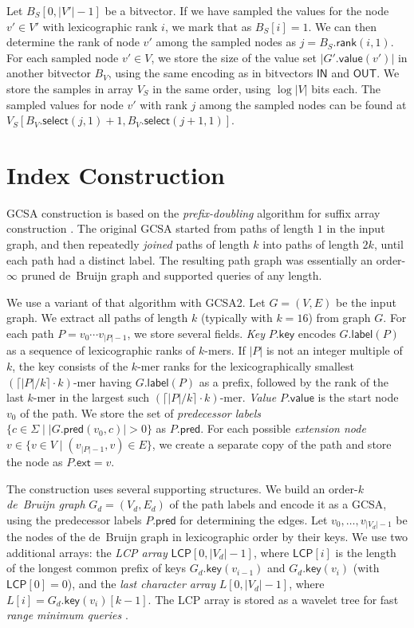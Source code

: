 \documentclass[twoside,leqno,twocolumn]{article}
\newcommand{\set}[1]{\ensuremath{\{ #1 \}}}
\newcommand{\abs}[1]{\ensuremath{\lvert #1 \rvert}}
\newcommand{\rank}{\ensuremath{\mathsf{rank}}}
\newcommand{\select}{\ensuremath{\mathsf{select}}}
\newcommand{\glabel}{\ensuremath{\mathsf{label}}}
\newcommand{\gpred}{\ensuremath{\mathsf{pred}}}
\newcommand{\gkey}{\ensuremath{\mathsf{key}}}
\newcommand{\gvalue}{\ensuremath{\mathsf{value}}}
\newcommand{\gext}{\ensuremath{\mathsf{ext}}}
\newcommand{\kmer}[1]{$#1$\nobreakdash-mer}
\newcommand{\orderk}[1]{order\nobreakdash-$#1$}
\newcommand{\LCP}{\ensuremath{\mathsf{LCP}}}
\newcommand{\bvIN}{\ensuremath{\mathsf{IN}}}
\newcommand{\bvOUT}{\ensuremath{\mathsf{OUT}}}
\begin{document}
Let $B_{S}[0, \abs{V'}-1]$ be a bitvector. If we have sampled the values for the node $v' \in V'$ with lexicographic rank $i$, we mark that as $B_{S}[i] = 1$. We can then determine the rank of node $v'$ among the sampled nodes as $j = B_{S}.\rank(i, 1)$. For each sampled node $v' \in V$, we store the size of the value set $\abs{G'.\gvalue(v')}$ in another bitvector $B_{V}$, using the same encoding as in bitvectors $\bvIN$ and $\bvOUT$. We store the samples in array $V_{S}$ in the same order, using $\log \abs{V}$ bits each. The sampled values for node $v'$ with rank $j$ among the sampled nodes can be found at $V_{S}[B_{V}.\select(j, 1) + 1, B_{V}.\select(j+1, 1)]$.


\section{Index Construction}\label{appendix:construction}

GCSA construction \cite{Siren2014} is based on the \emph{prefix-doubling} algorithm for suffix array construction \cite{Manber1993}. The original GCSA started from paths of length $1$ in the input graph, and then repeatedly \emph{joined} paths of length $k$ into paths of length $2k$, until each path had a distinct label. The resulting path graph was essentially an \orderk{\infty} pruned de~Bruijn graph and supported queries of any length.

We use a variant of that algorithm with GCSA2. Let $G = (V, E)$ be the input graph. We extract all paths of length $k$ (typically with $k = 16$) from graph $G$. For each path $P = v_{0} \dotsm v_{\abs{P}-1}$, we store several fields. \emph{Key} $P.\gkey$ encodes $G.\glabel(P)$ as a sequence of lexicographic ranks of \kmer{k}s. If $\abs{P}$ is not an integer multiple of $k$, the key consists of the \kmer{k} ranks for the lexicographically smallest \kmer{(\lceil \abs{P}/k \rceil \cdot k)} having $G.\glabel(P)$ as a prefix, followed by the rank of the last \kmer{k} in the largest such \kmer{(\lceil \abs{P}/k \rceil \cdot k)}. \emph{Value} $P.\gvalue$ is the start node $v_{0}$ of the path. We store the set of \emph{predecessor labels} $\set{c \in \Sigma \mid \abs{G.\gpred(v_{0}, c)} > 0}$ as $P.\gpred$. For each possible \emph{extension node} $v \in \set{v \in V \mid (v_{\abs{P}-1}, v) \in E}$, we create a separate copy of the path and store the node as $P.\gext = v$.

The construction uses several supporting structures. We build an \orderk{k} \emph{de~Bruijn graph} $G_{d} = (V_{d}, E_{d})$ of the path labels and encode it as a GCSA, using the predecessor labels $P.\gpred$ for determining the edges. Let $v_{0}, \dotsc, v_{\abs{V_{d}}-1}$ be the nodes of the de~Bruijn graph in lexicographic order by their keys. We use two additional arrays: the \emph{LCP array} $\LCP[0, \abs{V_{d}}-1]$, where $\LCP[i]$ is the length of the longest common prefix of keys $G_{d}.\gkey(v_{i-1})$ and $G_{d}.\gkey(v_{i})$ (with $\LCP[0] = 0$), and the \emph{last character array} $L[0, \abs{V_{d}}-1]$, where $L[i] = G_{d}.\gkey(v_{i})[k-1]$. The LCP array is stored as a wavelet tree for fast \emph{range minimum queries} \cite{Gagie2012a}.
\end{document}
